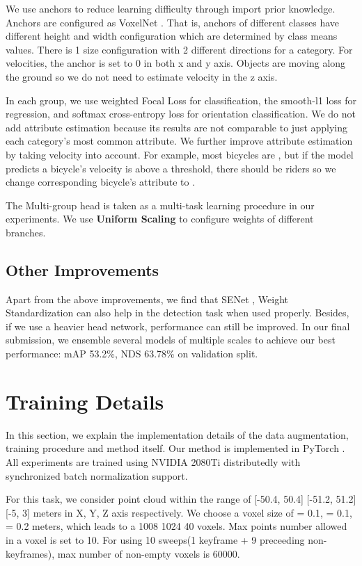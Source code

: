 \documentclass[10pt,twocolumn,letterpaper]{article}
\begin{document}
We use anchors to reduce learning difficulty through import prior knowledge. Anchors are configured as VoxelNet \cite{Zhou_2018_CVPR}. That is, anchors of different classes have different height and width configuration which are determined by class means values. There is 1 size configuration with 2 different directions for a category. For velocities, the anchor is set to 0 in both x and y axis. Objects are moving along the ground so we do not need to estimate velocity in the z axis.

In each group, we use weighted Focal Loss for classification, the smooth-l1 loss for  regression, and softmax cross-entropy loss for orientation classification. We do not add attribute estimation because its results are not comparable to just applying each category's most common attribute. We further improve attribute estimation by taking velocity into account. For example, most bicycles are , but if the model predicts a bicycle's velocity is above a threshold, there should be riders so we change corresponding bicycle's attribute to .

The Multi-group head is taken as a multi-task learning procedure in our experiments. We use \textbf{Uniform Scaling} to configure weights of different branches.

\subsection{Other Improvements}

Apart from the above improvements, we find that SENet \cite{Hu_2018_CVPR}, Weight Standardization \cite{DBLP:journals/corr/abs-1903-10520} can also help in the detection task when used properly. Besides, if we use a heavier head network, performance can still be improved. In our final submission, we ensemble several models of multiple scales to achieve our best performance: mAP 53.2\%, NDS 63.78\% on validation split.

\section{Training Details} \label{sec:training}

In this section, we explain the implementation details of the data augmentation, training procedure and method itself. Our method is implemented in PyTorch \cite{paszke2017automatic}. All experiments are trained using NVIDIA 2080Ti distributedly with synchronized batch normalization support.

For this task, we consider point cloud within the range of [-50.4, 50.4]  [-51.2, 51.2]  [-5, 3] meters in X, Y, Z axis respectively. We choose a voxel size of  = 0.1,  = 0.1,  = 0.2 meters, which leads to a 1008  1024  40 voxels. Max points number allowed in a voxel is set to 10. For using 10 sweeps(1 keyframe + 9 preceeding non-keyframes), max number of non-empty voxels is 60000. 
\end{document}
